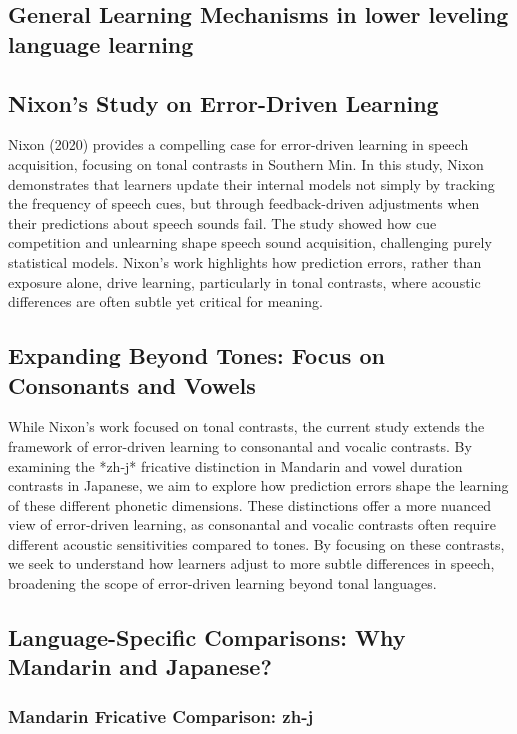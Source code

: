 \subsection{General Learning Mechanisms in lower leveling language learning}




\subsection{Nixon’s Study on Error-Driven Learning}

Nixon (2020) provides a compelling case for error-driven learning in speech acquisition, focusing on tonal contrasts in Southern Min. In this study, Nixon demonstrates that learners update their internal models not simply by tracking the frequency of speech cues, but through feedback-driven adjustments when their predictions about speech sounds fail. The study showed how cue competition and unlearning shape speech sound acquisition, challenging purely statistical models. Nixon's work highlights how prediction errors, rather than exposure alone, drive learning, particularly in tonal contrasts, where acoustic differences are often subtle yet critical for meaning.

\subsection{Expanding Beyond Tones: Focus on Consonants and Vowels}

While Nixon's work focused on tonal contrasts, the current study extends the framework of error-driven learning to consonantal and vocalic contrasts. By examining the *zh-j* fricative distinction in Mandarin and vowel duration contrasts in Japanese, we aim to explore how prediction errors shape the learning of these different phonetic dimensions. These distinctions offer a more nuanced view of error-driven learning, as consonantal and vocalic contrasts often require different acoustic sensitivities compared to tones. By focusing on these contrasts, we seek to understand how learners adjust to more subtle differences in speech, broadening the scope of error-driven learning beyond tonal languages.

\subsection{Language-Specific Comparisons: Why Mandarin and Japanese?}

\subsubsection{Mandarin Fricative Comparison: zh-j}

